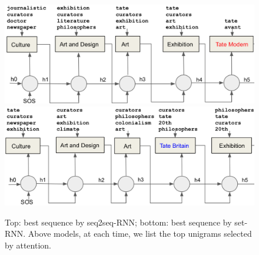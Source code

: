 %
\begin{figure}[t]
\includegraphics[width=1.0\columnwidth]{figs/train_sequence.png}
\includegraphics[width=1.0\columnwidth]{figs/train_set.png}

\caption{\fontsize{10}{12}\selectfont Top: best sequence by seq2seq-RNN; bottom: best sequence by set-RNN. Above models, at each time, we list the top unigrams selected by attention.\vspace{2ex}}
\label{fig:models}
\end{figure}